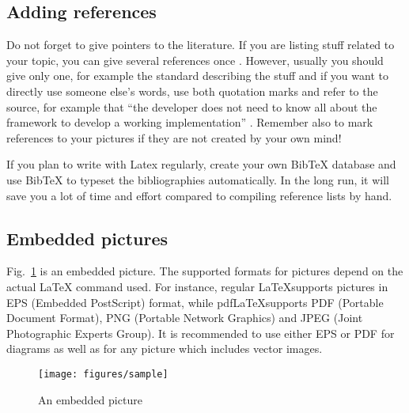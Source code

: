 \documentclass{cseminar}
\begin{document}


\subsection{Adding references}
\label{sec:references}

Do not forget to give pointers to the literature. If you are listing
stuff related to your topic, you can give several references once
\cite{Com00,HTS03,Nik99}. However, usually you should give only one, for example the standard describing the stuff \cite{RFC2408} and if you want to directly use someone else's words, use both quotation marks and refer to the source, for example that ``the developer does not need to know all about the framework to develop a working implementation'' \cite{Suo98}. Remember also to mark references to your pictures if they are not created by your own mind!

If you plan to write with Latex regularly, create your own BibTeX
database and use BibTeX to typeset the bibliographies automatically.
In the long run, it will save you a lot of time and effort compared to
compiling reference lists by hand.




\subsection{Embedded pictures}
\label{sec:pictures}

Fig.~\ref{fig:mypicture1} is an embedded picture. The supported formats for pictures
depend on the actual LaTeX command used. For instance, regular \LaTeX supports
pictures in EPS (Embedded PostScript) format, while pdf\LaTeX supports PDF (Portable
Document Format), PNG (Portable Network Graphics) and JPEG (Joint Photographic Experts
Group). It is recommended to use either EPS or PDF for diagrams as well as for any picture
which includes vector images.

\begin{figure}[t]
  \begin{center}
    \texttt{[image: figures/sample]}
    \caption{An embedded picture}
    \label{fig:mypicture1}
  \end{center}
\end{figure}
\end{document}
